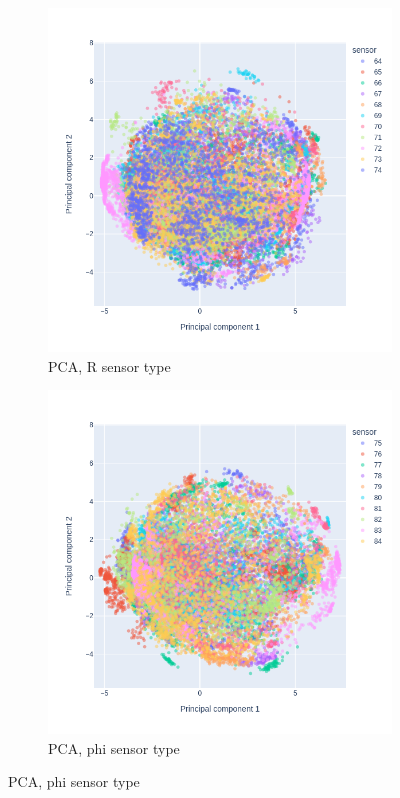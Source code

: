 


 \begin{figure}
\centering
\begin{subfigure}[b]{0.45\textwidth}
    \centering
    \includegraphics[width=\linewidth]{figures/chapter4/dimred/PCA_pedestals_phi_0.png}
\caption{PCA, R sensor type}
  \label{plot:PCA_pedestals_0_phi}
  \end{subfigure}
\begin{subfigure}[b]{0.45\textwidth}
    \centering
    \includegraphics[width=\linewidth]{figures/chapter4/dimred/PCA_pedestals_phi_1.png}
\caption{PCA, phi sensor type}
   \label{plot:PCA_pedestals_1_phi}
  \end{subfigure}



\end{figure}

